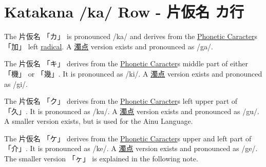 \section{Katakana /ka/ Row - 片仮名 カ行}\label{sec:KatakanaKaRow}


\label{letter:ka} The  片仮名 {「カ」} is pronounced  /ka/ and  derives from the
\hyperref[sec:PhoneticCharacter]{Phonetic Caracter}s {「加」} left
\hyperref[sec:Radical]{radical}.  A \hyperref[sec:Dakuten]{濁点} version exists
and pronounced as /ga/.




\label{letter:ki} The 片仮名 {「キ」} derives from the
\hyperref[sec:PhoneticCharacter]{Phonetic Caracter}s middle part of either {「機」} or
{「幾」}.  It is pronounced as /ki/.  A \hyperref[sec:Dakuten]{濁点} version
exists and pronounced as /gi/.


\label{letter:ku} The 片仮名 {「ク」} derives from the
\hyperref[sec:PhoneticCharacter]{Phonetic Caracter}s left upper part of {「久」}.  It
is pronounced as /ku/.  A \hyperref[sec:Dakuten]{濁点} version exists and
pronounced as /gu/.  A smaller version exists, but is used for the Ainu
Language.



\label{letter:ke} The 片仮名 {「ケ」} derives from the
\hyperref[sec:PhoneticCharacter]{Phonetic Caracter}s upper and left part of {「介」}.
It is pronounced as /ke/.  A \hyperref[sec:Dakuten]{濁点} version exists and
pronounced as /ge/.  The smaller version {「ヶ」} is explained in the following
note.

\newpage


